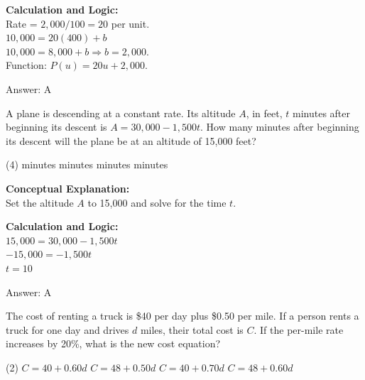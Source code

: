 \documentclass[11pt,paper=a4,answers]{exam}
\begin{document}
\begin{questions}
\begin{solution}
\vspace{10pt}
\textbf{Calculation and Logic:} \\
Rate = $2,000 / 100 = 20$ per unit. \\
$10,000 = 20(400) + b$ \\
$10,000 = 8,000 + b \Rightarrow b = 2,000$. \\
Function: $P(u) = 20u + 2,000$.

\vspace{15pt}
Answer: \colorbox{yellow!100}{A}
\end{solution}

\vspace{20pt}

\question
A plane is descending at a constant rate. Its altitude $A$, in feet, $t$ minutes after beginning its descent is $A = 30,000 - 1,500t$. How many minutes after beginning its descent will the plane be at an altitude of 15,000 feet?
\begin{tasks}(4)
     minutes
     minutes
     minutes
     minutes
\end{tasks}

\begin{solution}
\textbf{Conceptual Explanation:} \\
Set the altitude $A$ to 15,000 and solve for the time $t$.

\vspace{10pt}
\textbf{Calculation and Logic:} \\
$15,000 = 30,000 - 1,500t$ \\
$-15,000 = -1,500t$ \\
$t = 10$

\vspace{15pt}
Answer: \colorbox{yellow!100}{A}
\end{solution}

\vspace{20pt}

\question
The cost of renting a truck is \$40 per day plus \$0.50 per mile. If a person rents a truck for one day and drives $d$ miles, their total cost is $C$. If the per-mile rate increases by 20\%, what is the new cost equation?
\begin{tasks}(2)
    \task $C = 40 + 0.60d$
    \task $C = 48 + 0.50d$
    \task $C = 40 + 0.70d$
    \task $C = 48 + 0.60d$
\end{tasks}


\end{questions}
\end{document}
